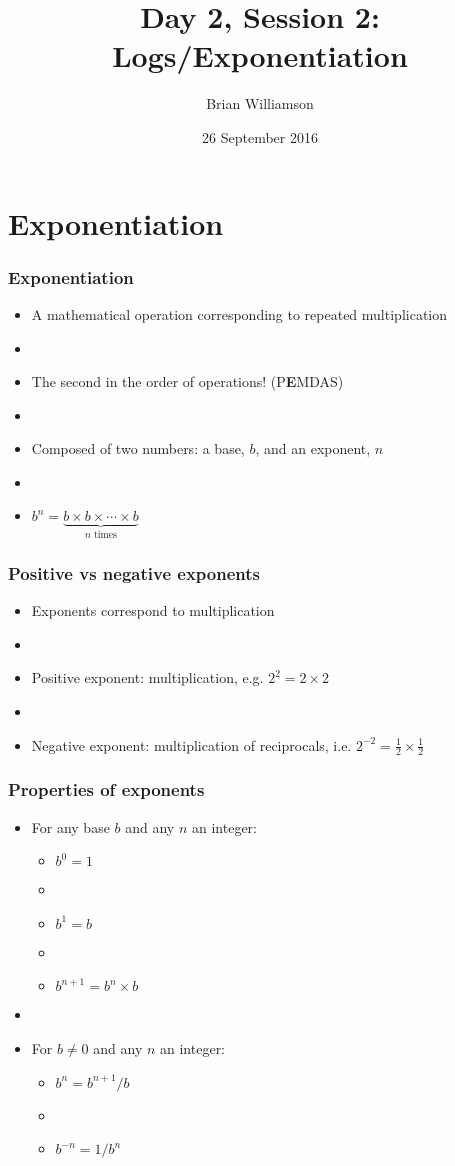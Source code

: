 \documentclass[12pt]{beamer}
\title{Day 2, Session 2: Logs/Exponentiation}
\author{Brian Williamson}
\institute{EPI/BIOST Bootcamp 2016}
\date{26 September 2016}
\newcommand{\myframe}[1]{\begin{frame} \frametitle{#1}}
\begin{document}
\begin{frame}
\titlepage
\end{frame}

\section{Exponentiation}
\myframe{Exponentiation}
\begin{itemize}
\item A mathematical operation corresponding to repeated multiplication
\item[]
\item The second in the order of operations! (P{\textbf E}MDAS)
\item[]
\item Composed of two numbers: a base, $b$, and an exponent, $n$
\item[]
\item $b^n = \underbrace{b\times b \times \cdots \times b}_\text{$n$ times}$
\end{itemize}
\end{frame}

\myframe{Positive vs negative exponents}
\begin{itemize}
\item Exponents correspond to multiplication
\item[]
\item Positive exponent: multiplication, e.g. $2^2 = 2\times 2$
\item[]
\item Negative exponent: multiplication of reciprocals, i.e. $2^{-2} = \frac{1}{2}\times \frac{1}{2}$
\end{itemize}
\end{frame}

\myframe{Properties of exponents}
\begin{itemize}
\item For any base $b$ and any $n$ an integer:
\begin{itemize}
\item $b^0 = 1$
\item[]
\item $b^1 = b$
\item[]
\item $b^{n+1} = b^n \times b$
\end{itemize}
\item[]
\item For $b \neq 0$ and any $n$ an integer:
\begin{itemize}
\item $b^n = b^{n+1}/b$
\item[]
\item $b^{-n} = 1/b^n$
\end{itemize}
\end{itemize}
\end{frame}
\end{document}
